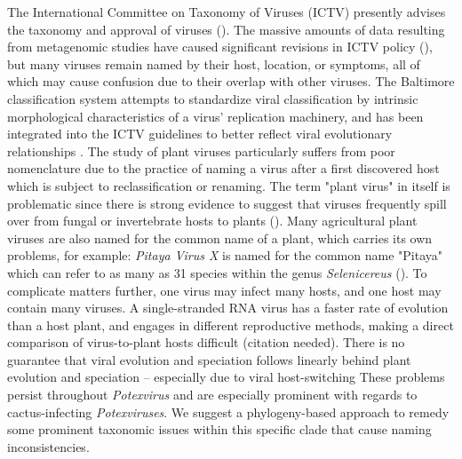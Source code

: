 \documentclass[11pt,letterpaper,titlepage]{article}
\begin{document}
\begin{linenumbers}
The International Committee on Taxonomy of Viruses (ICTV) presently advises the taxonomy and approval of viruses (\cite{simmonds2017virus, lefkowitz2018virus,international2020new}).
The massive amounts of data resulting from metagenomic studies have caused significant revisions in ICTV policy (\cite{international2020new, simmonds2017virus}), but many viruses remain named by their host, location, or symptoms, all of which may cause confusion due to their overlap with other viruses.  
The Baltimore classification system attempts to standardize viral classification by intrinsic morphological characteristics of a virus' replication machinery, and has been integrated into the ICTV guidelines to better reflect viral evolutionary relationships \cite{international2020new}. 
The study of plant viruses particularly suffers from poor nomenclature due to the practice of naming a virus after a first discovered host which is subject to reclassification or renaming. 
The term "plant virus" in itself is problematic since there is strong evidence to suggest that viruses frequently spill over from fungal or invertebrate hosts to plants (\cite{lefeuvre_evolution_2019}).
Many agricultural plant viruses are also named for the common name of a plant, which carries its own problems, for example: \textit{Pitaya Virus X} is named for the common name "Pitaya" which can refer to as many as 31 species within the genus \textit{Selenicereus} (\cite{korotkova_phylogenetic_2017, guerrero_phylogenetic_2019, le_bellec_12_2011}). 
To complicate matters further, one virus may infect many hosts, and one host may contain many viruses. 
A single-stranded RNA virus has a faster rate of evolution than a host plant, and engages in different reproductive methods, making a direct comparison of virus-to-plant hosts difficult (citation needed).
There is no guarantee that viral evolution and speciation follows linearly behind plant evolution and speciation -- especially due to viral host-switching 
These problems persist throughout \textit{Potexvirus} and are especially prominent with regards to cactus-infecting \textit{Potexviruses}.
We suggest a phylogeny-based approach to remedy some prominent taxonomic issues within this specific clade that cause naming inconsistencies. 




\end{linenumbers}
\end{document}
